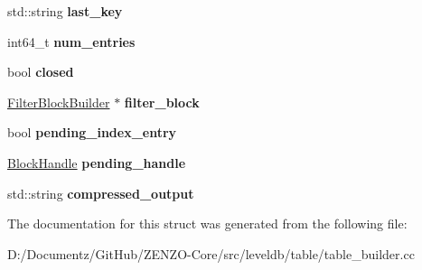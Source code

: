 \begin{DoxyCompactItemize}
std\+::string {\bfseries last\+\_\+key}
\item 
\mbox{\label{structleveldb_1_1_table_builder_1_1_rep_a89f93baffb3ca5c8239796dc1a57777a}} 
int64\+\_\+t {\bfseries num\+\_\+entries}
\item 
\mbox{\label{structleveldb_1_1_table_builder_1_1_rep_a5324550d58b999bcea173b1c21060138}} 
bool {\bfseries closed}
\item 
\mbox{\label{structleveldb_1_1_table_builder_1_1_rep_aad1620ca746b7287a819880be083ec6b}} 
\mbox{\hyperlink{classleveldb_1_1_filter_block_builder}{Filter\+Block\+Builder}} $\ast$ {\bfseries filter\+\_\+block}
\item 
\mbox{\label{structleveldb_1_1_table_builder_1_1_rep_a56e14221a2e29941a37d208f99770c20}} 
bool {\bfseries pending\+\_\+index\+\_\+entry}
\item 
\mbox{\label{structleveldb_1_1_table_builder_1_1_rep_abf3b47f6f2b7407399c7134ac65f7225}} 
\mbox{\hyperlink{classleveldb_1_1_block_handle}{Block\+Handle}} {\bfseries pending\+\_\+handle}
\item 
\mbox{\label{structleveldb_1_1_table_builder_1_1_rep_ae299e513afc71a8474c303b25aaadb08}} 
std\+::string {\bfseries compressed\+\_\+output}
\end{DoxyCompactItemize}


The documentation for this struct was generated from the following file\+:\begin{DoxyCompactItemize}
\item 
D\+:/\+Documentz/\+Git\+Hub/\+Z\+E\+N\+Z\+O-\/\+Core/src/leveldb/table/table\+\_\+builder.\+cc\end{DoxyCompactItemize}
